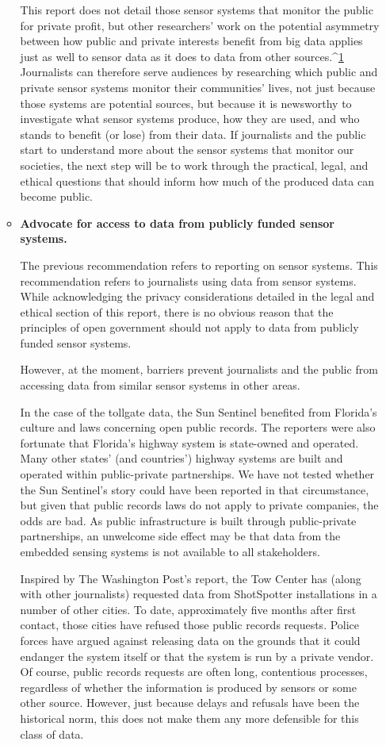 \begin{itemize}
\begin{itemized}
\begin{itemize}
This report does not detail those sensor systems that monitor the public for
private profit, but other researchers' work on the potential asymmetry
between how public and private interests benefit from big data applies just
as well to sensor data as it does to data from other sources.^{\href{#endnotes-stauffer}{1}} Journalists can
therefore serve audiences by researching which public and private sensor
systems monitor their communities' lives, not just because those systems
are potential sources, but because it is newsworthy to investigate what sensor
systems produce, how they are used, and who stands to benefit (or lose)
from their data. If journalists and the public start to understand more about
the sensor systems that monitor our societies, the next step will be to work
through the practical, legal, and ethical questions that should inform how
much of the produced data can become public.

\item \textbf{Advocate for access to data from publicly funded sensor systems.}

The previous recommendation refers to reporting on sensor systems. This
recommendation refers to journalists using data from sensor systems. While
acknowledging the privacy considerations detailed in the legal and ethical
section of this report, there is no obvious reason that the principles of open government
should not apply to data from publicly funded sensor systems.

However, at the moment, barriers prevent journalists and the public from
accessing data from similar sensor systems in other areas.

In the case of the tollgate data, the Sun Sentinel benefited from Florida's
culture and laws concerning open public records. The reporters were also
fortunate that Florida's highway system is state-owned and operated. Many
other states' (and countries') highway systems are built and operated within
public-private partnerships. We have not tested whether the Sun Sentinel's
story could have been reported in that circumstance, but given that public
records laws do not apply to private companies, the odds are bad. As public
infrastructure is built through public-private partnerships, an unwelcome
side effect may be that data from the embedded sensing systems is not available
to all stakeholders.

Inspired by The Washington Post's report, the Tow Center has (along with
other journalists) requested data from ShotSpotter installations in a number
of other cities. To date, approximately five months after first contact, those
cities have refused those public records requests. Police forces have argued
against releasing data on the grounds that it could endanger the system
itself or that the system is run by a private vendor. Of course, public records
requests are often long, contentious processes, regardless of whether the
information is produced by sensors or some other source. However, just
because delays and refusals have been the historical norm, this does not
make them any more defensible for this class of data.
\end{itemize}


\end{itemized}
\end{itemize}
